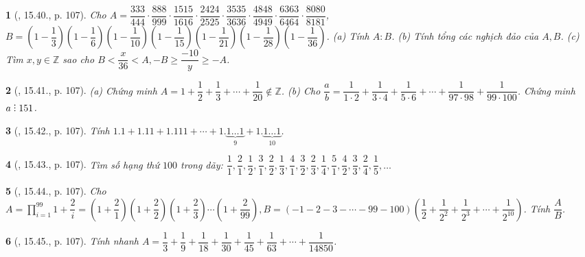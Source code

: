 \documentclass{article}
\newtheorem{baitoan}{}
\DeclareRobustCommand{\divby}{%
	\mathrel{\vbox{\baselineskip.65ex\lineskiplimit0pt\hbox{.}\hbox{.}\hbox{.}}}%
}
\begin{document}
\begin{baitoan}[\cite{TLCT_THCS_Toan_6_so_hoc}, 15.40., p. 107]
	Cho $A = \dfrac{333}{444}\cdot\dfrac{888}{999}\cdot\dfrac{1515}{1616}\cdot\dfrac{2424}{2525}\cdot\dfrac{3535}{3636}\cdot\dfrac{4848}{4949}\cdot\dfrac{6363}{6464}\cdot\dfrac{8080}{8181}$,\\$B = \left(1 - \dfrac{1}{3}\right)\left(1 - \dfrac{1}{6}\right)\left(1 - \dfrac{1}{10}\right)\left(1 - \dfrac{1}{15}\right)\left(1 - \dfrac{1}{21}\right)\left(1 - \dfrac{1}{28}\right)\left(1 - \dfrac{1}{36}\right)$. (a) Tính $A:B$. (b) Tính tổng các nghịch đảo của $A,B$. (c) Tìm $x,y\in\mathbb{Z}$ sao cho $B < \dfrac{x}{36} < A,-B\ge\dfrac{-10}{y}\ge-A$.
\end{baitoan}

\begin{baitoan}[\cite{TLCT_THCS_Toan_6_so_hoc}, 15.41., p. 107]
	(a) Chứng minh $A = 1 + \dfrac{1}{2} + \dfrac{1}{3} + \cdots + \dfrac{1}{20}\notin\mathbb{Z}$. (b) Cho $\dfrac{a}{b} = \dfrac{1}{1\cdot2} + \dfrac{1}{3\cdot4} + \dfrac{1}{5\cdot6} + \cdots + \dfrac{1}{97\cdot98} + \dfrac{1}{99\cdot100}$. Chứng minh $a\divby151$.
\end{baitoan}

\begin{baitoan}[\cite{TLCT_THCS_Toan_6_so_hoc}, 15.42., p. 107]
	Tính $1.1 + 1.11 + 1.111 + \cdots + 1.\underbrace{1\ldots1}_9 + 1.\underbrace{1\ldots1}_{10}$.
\end{baitoan}

\begin{baitoan}[\cite{TLCT_THCS_Toan_6_so_hoc}, 15.43., p. 107]
	Tìm số hạng thứ $100$ trong dãy: $\dfrac{1}{1},\dfrac{2}{1},\dfrac{1}{2},\dfrac{3}{1},\dfrac{2}{2},\dfrac{1}{3},\dfrac{4}{1},\dfrac{3}{2},\dfrac{2}{3},\dfrac{1}{4},\dfrac{5}{1},\dfrac{4}{2},\dfrac{3}{3},\dfrac{2}{4},\dfrac{1}{5},\ldots$
\end{baitoan}

\begin{baitoan}[\cite{TLCT_THCS_Toan_6_so_hoc}, 15.44., p. 107]
	Cho $A = \prod_{i=1}^{99} 1 + \dfrac{2}{i} = \left(1 + \dfrac{2}{1}\right)\left(1 + \dfrac{2}{2}\right)\left(1 + \dfrac{2}{3}\right)\cdots\left(1 + \dfrac{2}{99}\right),B = (-1 - 2 - 3 - \cdots - 99 - 100)\left(\dfrac{1}{2} + \dfrac{1}{2^2} + \dfrac{1}{2^3} + \cdots + \dfrac{1}{2^{10}}\right)$. Tính $\dfrac{A}{B}$.
\end{baitoan}

\begin{baitoan}[\cite{TLCT_THCS_Toan_6_so_hoc}, 15.45., p. 107]
	Tính nhanh $A = \dfrac{1}{3} + \dfrac{1}{9} + \dfrac{1}{18} + \dfrac{1}{30} + \dfrac{1}{45} + \dfrac{1}{63} + \cdots + \dfrac{1}{14850}$.
\end{baitoan}
\end{document}
